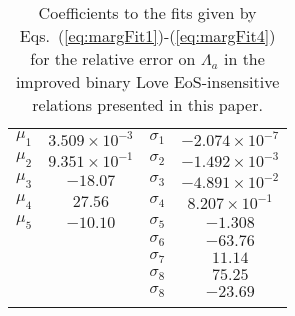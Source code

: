 \documentclass[prd,twocolumn,nofootinbib,superscriptaddress,amsmath,amssymb]{revtex4-1}
\begin{document}
\begin{table}
\centering
\caption{
Coefficients to the fits given by Eqs.~(\ref{eq:margFit1})-(\ref{eq:margFit4}) for the relative error on $\Lambda_a$ in the improved binary Love EoS-insensitive relations presented in this paper.
}\label{tab:marginalized}
\addtolength{\tabcolsep}{1pt} 
\begin{tabular}{ c | c || c | c}
\hline 
\noalign{\smallskip}
$\mu_1$ & $3.509 \times 10^{-3}$ & $\sigma_1$ & $-2.074 \times 10^{-7}$\\
$\mu_2$ & $9.351 \times 10^{-1}$ & $\sigma_2$ & $-1.492 \times 10^{-3}$\\
$\mu_3$ & $-18.07$ & $\sigma_3$ & $-4.891 \times 10^{-2}$\\
$\mu_4$ & $27.56$ & $\sigma_4$ & $8.207 \times 10^{-1}$\\
$\mu_5$ & $-10.10$ & $\sigma_5$ & $-1.308$\\
 &  & $\sigma_6$ & $-63.76$\\
 &  & $\sigma_7$ & $11.14$\\
 &  & $\sigma_8$ & $75.25$\\
 &  & $\sigma_8$ & $-23.69$\\
 \noalign{\smallskip}
 \hline
\end{tabular}
\addtolength{\tabcolsep}{-1pt}
\end{table}
\end{document}
